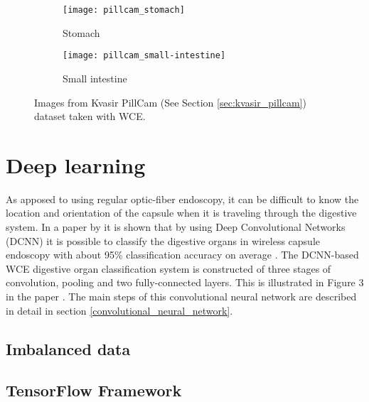 \documentclass[thesis.tex]{subfiles}
\begin{document}
\begin{figure} %
  \centering
  \begin{subfigure}[b]{0.4\linewidth}
    \centering
    \texttt{[image: pillcam\_stomach]}
    \caption{Stomach}
    \label{fig:pillcam_stomach}
  \end{subfigure}
  \quad
  \begin{subfigure}[b]{0.4\linewidth}
    \centering
    \texttt{[image: pillcam\_small-intestine]}
    \caption{Small intestine}
    \label{fig:pillcam_colon}
  \end{subfigure}
  \caption[Images taken with WCE]{Images from Kvasir PillCam (See Section \ref{sec:kvasir_pillcam}) dataset taken with WCE.}
  \label{fig:pillcam_examples}
\end{figure}



\newpage
\section{Deep learning} \label{sec:deep_learning}
As apposed to using regular optic-fiber endoscopy, it can be difficult to know the location and orientation of the capsule when it is traveling through the digestive system. In a paper by \citeauthor*{ClassifyingDigestive15} it is shown that by using Deep Convolutional Networks (DCNN) it is possible to classify the digestive organs in wireless capsule endoscopy with about 95\% classification accuracy on average \cite{ClassifyingDigestive15}.
The DCNN-based WCE digestive organ classification system is constructed of three stages of convolution, pooling and two fully-connected layers. This is illustrated in Figure 3 in the paper \cite{ClassifyingDigestive15}. The main steps of this convolutional neural network are described in detail in section \ref{convolutional_neural_network}.

\subsection{Imbalanced data}

\subsection{TensorFlow Framework} %
\end{document}
